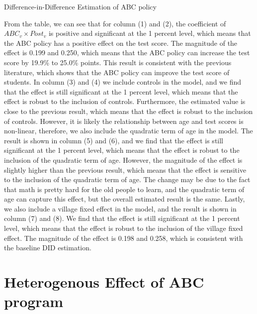 \documentclass[12pt]{jfm}
\begin{document}
\begin{table}
  \begin{center}
    \begin{footnotesize}
    \caption{Difference-in-Difference Estimation of ABC policy}
    \label{tab:did_result}
    
    \end{footnotesize}
  \end{center}
\end{table}

From the table, we can see that for column (1) and (2), the coefficient of $ABC_v \times Post_v$ is positive and significant at the 1 percent level, which means that the ABC policy has a positive effect on the test score. The magnitude of the effect is 0.199 and 0.250, which means that the ABC policy can increase the test score by 19.9\% to 25.0\% points. This result is consistent with the previous literature, which shows that the ABC policy can improve the test score of students. In column (3) and (4) we include controls in the model, and we find that the effect is still significant at the 1 percent level, which means that the effect is robust to the inclusion of controls. Furthermore, the estimated value is close to the previous result, which means that the effect is robust to the inclusion of controls. However, it is likely the relationship between age and test scores is non-linear, therefore, we also include the quadratic term of age in the model. The result is shown in column (5) and (6), and we find that the effect is still significant at the 1 percent level, which means that the effect is robust to the inclusion of the quadratic term of age. However, the magnitude of the effect is slightly higher than the previous result, which means that the effect is sensitive to the inclusion of the quadratic term of age. The change may be due to the fact that math is pretty hard for the old people to learn, and the quadratic term of age can capture this effect, but the overall estimated result is the same. Lastly, we also include a village fixed effect in the model, and the result is shown in column (7) and (8). We find that the effect is still significant at the 1 percent level, which means that the effect is robust to the inclusion of the village fixed effect. The magnitude of the effect is 0.198 and 0.258, which is consistent with the baseline DID estimation.

\section{Heterogenous Effect of ABC program} \label{sec:heterogenous}
\end{document}
